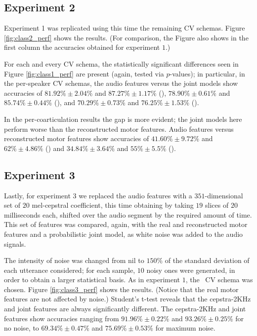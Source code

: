 \subsection{Experiment 2}
\label{subsec:exp2}

Experiment 1 was replicated using this time the remaining CV schemas.
Figure \ref{fig:class2_perf} shows the results. (For comparison,
the Figure also shows in the first column the accuracies obtained for
experiment $1$.)

For each and every CV schema, the statistically significant differences seen in
Figure \ref{fig:class1_perf} are present (again, tested via $p$-values);
in particular, in the per-speaker CV schemas, the audio features versus
the joint models show accuracies of
$81.92\% \pm 2.04\%$ and $87.27\% \pm 1.17\%$ (\spka),
$78.90\% \pm 0.61\%$ and $85.74\% \pm 0.44\%$ (\spkb), and
$70.29\% \pm 0.73\%$ and $76.25\% \pm 1.53\%$ (\spkc).

In the per-coarticulation results the gap is more evident; the joint models
here perform worse than the reconstructed motor features. Audio features
versus reconstructed motor features show accuracies of
$41.60\% \pm 9.72\%$ and $62\% \pm 4.86\%$ (\coa) and
$34.84\% \pm 3.64\%$ and $55\% \pm 5.5\%$ (\cob).

\subsection{Experiment 3}
\label{subsec:exp3}

Lastly, for experiment 3 we replaced the audio features with
a $351$-dimensional set of $20$ mel-cepstral
coefficient, this time obtaining by taking $19$ slices of $20$ milliseconds each,
shifted over the audio segment by the required amount of time. This set of
features was compared, again, with the real and reconstructed motor features and
a probabilistic joint model, as white noise was added to the audio signals.

The intensity of noise was changed from nil to $150\%$ of the standard deviation
of each utterance considered; for each sample, $10$ noisy ones were generated, in
order to obtain a larger statistical basis. As in experiment $1$, the \overall\ CV
schema was chosen. Figure \ref{fig:class3_perf} shows the results.
(Notice that the real motor features are not affected by noise.) Student's t-test
reveals that the cepstra-2KHz and joint features are always significantly different.
The cepstra-2KHz and joint features show accuracies ranging from
$91.96\% \pm 0.22\%$ and $93.26\% \pm 0.25\%$ for no noise, to
$69.34\% \pm 0.47\%$ and $75.69\% \pm 0.53\%$ for maximum noise.
